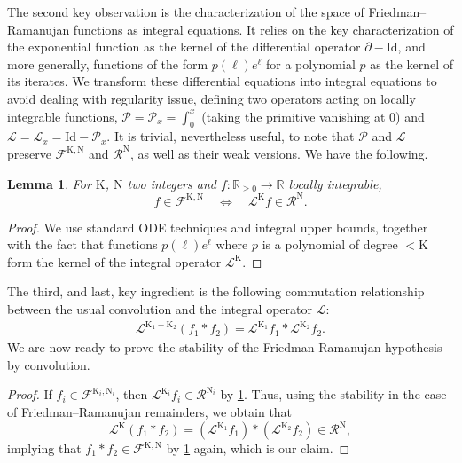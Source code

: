 \documentclass[12pt,twoside]{article}
\theoremstyle{theorem}
\newtheorem{lem}[thm]{Lemma}
\theoremstyle{remark}
\theoremstyle{definition}
\theoremstyle{example}
\newcommand{\R}{\mathbb{R}}
\newcommand{\1}[1]{\mathds{1}_{#1}}
\newcommand{\cR}{\mathcal{R}}
\newcommand{\cF}{\mathcal{F}}
\newcommand{\cL}{\mathcal{L}}
\newcommand{\cP}{\mathcal{P}}
\newcommand{\rK}{\mathrm{K}}
\newcommand{\rN}{\mathrm{N}}
\begin{document}
The second key observation is the characterization of the space of Friedman--Ramanujan functions as
integral equations. It relies on the key characterization of the exponential function as the kernel
of the differential operator $\partial - \mathrm{Id}$, and more generally, functions of the form
$p(\ell)e^\ell$ for a polynomial $p$ as the kernel of its iterates.  We transform these differential
equations into integral equations to avoid dealing with regularity issue, defining two operators
acting on locally integrable functions, $\cP=\cP_x=\int_0^x$ (taking the primitive vanishing at $0$)
and $\cL=\cL_x=\mathrm{Id}-\cP_x$. It is trivial, nevertheless useful, to note that $\cP$ and $\cL$
preserve $\cF^{\rK,\rN}$ and $\cR^{\rN}$, as well as their weak versions. We have the following.

\begin{lem}\label{p:charFR} For $\rK$, $\rN$ two integers and $f : \R_{\geq 0} \rightarrow \R$
  locally integrable,
  \begin{equation*}
    f\in \cF^{\rK,\rN}
    \quad \Leftrightarrow \quad
    \cL^{\rK} f\in \cR^{\rN}.
    \end{equation*}
  \end{lem}

  \begin{proof}
    We use standard ODE techniques and integral upper bounds, together with the fact that functions
    $p(\ell)e^\ell$ where $p$ is a polynomial of degree $< \rK$ form the kernel of the integral
    operator $\cL^{\rK}$.
  \end{proof}

  The third, and last, key ingredient is the following commutation relationship between the usual
  convolution and the integral operator $\cL$:  
  \begin{align}\label{e:easyconvo}
    \cL^{\rK_1+\rK_2} (f_1 * f_2)= \cL^{\rK_1} f_1 * \cL^{\rK_2} f_2.
  \end{align}
  We are now ready to prove the stability of the Friedman-Ramanujan hypothesis by convolution.

  \begin{proof}
    If $f_i\in \cF^{\rK_i,\rN_i}$, then $\cL^{\rK_i} f_i \in \cR^{\rN_i}$ by \cref{p:charFR}. Thus,
    using the stability in the case of Friedman--Ramanujan remainders, we obtain that
    \begin{equation}
      \cL^{\rK} (f_1 * f_2) = (\cL^{\rK_1}f_1) * (\cL^{\rK_2}f_2)\in \cR^{\rN},
    \end{equation}
    implying that $f_1 * f_2\in \cF^{\rK,\rN}$ by \cref{p:charFR} again, which is our claim.
  \end{proof}
\end{document}

